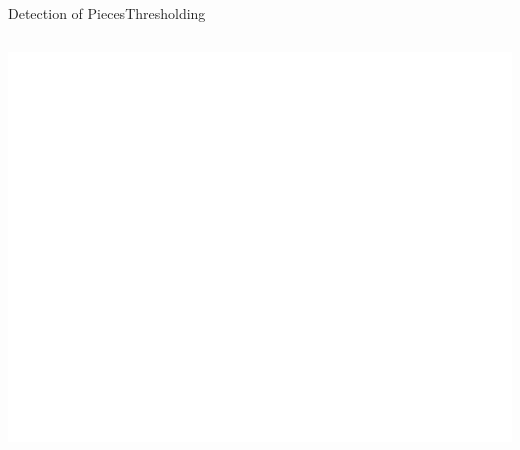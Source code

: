 \documentclass[table]{beamer}
\begin{document}
\begin{frame}{Detection of Pieces}{Thresholding}
\begin{columns}
\begin{column}{0.28\textwidth}
{				\includegraphics[width=\columnwidth]{images/dummy.png}%
			}%
			\vfill
		\end{column}
	\end{columns}
\end{frame}
\end{document}
